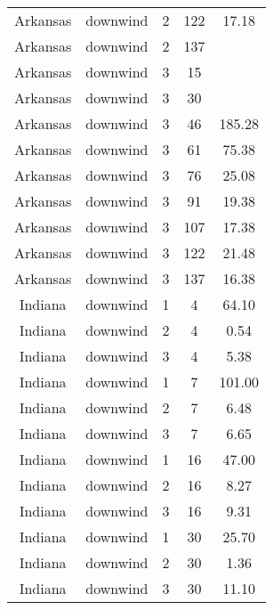 \documentclass{article}
\begin{document}
\begin{longtable}[H]{ccccc}
Arkansas  & downwind  & 2        & 122          & 17.18                   \\
Arkansas  & downwind  & 2        & 137          &                         \\
Arkansas  & downwind  & 3        & 15           &                         \\
Arkansas  & downwind  & 3        & 30           &                         \\
Arkansas  & downwind  & 3        & 46           & 185.28                  \\
Arkansas  & downwind  & 3        & 61           & 75.38                   \\
Arkansas  & downwind  & 3        & 76           & 25.08                   \\
Arkansas  & downwind  & 3        & 91           & 19.38                   \\
Arkansas  & downwind  & 3        & 107          & 17.38                   \\
Arkansas  & downwind  & 3        & 122          & 21.48                   \\
Arkansas  & downwind  & 3        & 137          & 16.38                   \\
Indiana   & downwind  & 1        & 4            & 64.10                   \\
Indiana   & downwind  & 2        & 4            & 0.54                    \\
Indiana   & downwind  & 3        & 4            & 5.38                    \\
Indiana   & downwind  & 1        & 7            & 101.00                  \\
Indiana   & downwind  & 2        & 7            & 6.48                    \\
Indiana   & downwind  & 3        & 7            & 6.65                    \\
Indiana   & downwind  & 1        & 16           & 47.00                   \\
Indiana   & downwind  & 2        & 16           & 8.27                    \\
Indiana   & downwind  & 3        & 16           & 9.31                    \\
Indiana   & downwind  & 1        & 30           & 25.70                   \\
Indiana   & downwind  & 2        & 30           & 1.36                    \\
Indiana   & downwind  & 3        & 30           & 11.10                   \\

\end{longtable}
\end{document}

